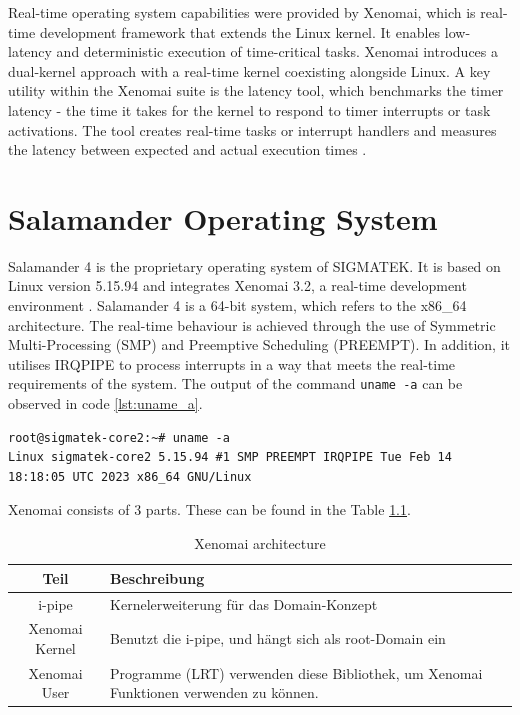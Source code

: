 \documentclass[MMR,Master,english]{twbook}
\begin{document}
\bigskip \noindent Real-time operating system capabilities were provided by Xenomai, which is real-time development framework that extends the Linux kernel. It enables low-latency and deterministic execution of time-critical tasks. Xenomai introduces a dual-kernel approach with a real-time kernel coexisting alongside Linux. A key utility within the Xenomai suite is the latency tool, which benchmarks the timer latency - the time it takes for the kernel to respond to timer interrupts or task activations. The tool creates real-time tasks or interrupt handlers and measures the latency between expected and actual execution times \cite{XenomaiXenomai}.


\clearpage 
\chapter{Salamander Operating System}

Salamander 4 is the proprietary operating system of SIGMATEK. It is based on Linux version 5.15.94 and integrates Xenomai 3.2, a real-time development environment \cite{XenomaiXenomai}. Salamander 4 is a 64-bit system, which refers to the x86\_64 architecture. The real-time behaviour is achieved through the use of Symmetric Multi-Processing (SMP) and Preemptive Scheduling (PREEMPT). In addition, it utilises IRQPIPE to process interrupts in a way that meets the real-time requirements of the system. The output of the command \texttt{uname -a} can be observed in code \ref{lst:uname_a}.

\vspace{1em}
\begin{minipage}{0.95\columnwidth}
\begin{lstlisting}[name={System information},label={lst:uname_a}]
root@sigmatek-core2:~# uname -a
Linux sigmatek-core2 5.15.94 #1 SMP PREEMPT IRQPIPE Tue Feb 14 18:18:05 UTC 2023 x86_64 GNU/Linux
\end{lstlisting}
\end{minipage}



Xenomai consists of 3 parts. These can be found in the Table \ref{tab:what_is_xenomai}.

\begin{table}[!h]
    \centering
    \caption[Xenomai architecture]{Xenomai architecture}
    \label{tab:what_is_xenomai}
    \setlength{\tabcolsep}{0.5em} %
    {\renewcommand{\arraystretch}{1.2}%
    \begin{tabular}{|c|p{}|}
        \hline
        \textbf{Teil} & \textbf{Beschreibung} \\ \hline
        i-pipe  & Kernelerweiterung für das Domain-Konzept \\ \hline
        Xenomai Kernel & Benutzt die i-pipe, und hängt sich als root-Domain ein \\ \hline
        Xenomai User &  Programme (LRT) verwenden diese Bibliothek, um Xenomai Funktionen verwenden zu können. \\ \hline
    \end{tabular}}
  \end{table}
  
\end{document}
